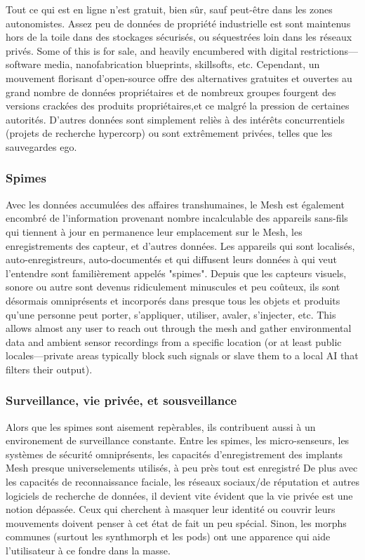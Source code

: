 Tout ce qui est en ligne n'est gratuit, bien sûr, sauf peut-être dans les zones autonomistes. Assez peu de données de propriété industrielle est sont maintenus hors de la toile dans des stockages sécurisés, ou séquestrées loin dans les réseaux privés. Some of this is for sale, and heavily encumbered with digital restrictions—software media, nanofabrication blueprints, skillsofts, etc. Cependant, un mouvement florisant d'open-source offre des alternatives gratuites et ouvertes au grand nombre de données propriétaires et de nombreux groupes fourgent des versions crackées des produits propriétaires,et ce malgré la pression de certaines autorités. D'autres données sont simplement reliès à des intérêts concurrentiels (projets de recherche hypercorp) ou sont extrêmement privées, telles que les sauvegardes ego. 

\subsubsection{Spimes} 

Avec les données accumulées des affaires transhumaines, le Mesh est également encombré de l'information provenant nombre incalculable des appareils sans-fils qui tiennent à jour en permanence leur emplacement sur le Mesh, les enregistrements des capteur, et d'autres données. Les appareils qui sont localisés, auto-enregistreurs, auto-documentés et qui diffusent leurs données à qui veut l'entendre sont familièrement appelés "spimes". Depuis que les capteurs visuels, sonore ou autre sont devenus ridiculement minuscules et peu coûteux, ils sont désormais omniprésents et incorporés dans presque tous les objets et produits qu'une personne peut porter, s'appliquer, utiliser, avaler, s'injecter, etc. This allows almost any user to reach out through the mesh and gather environmental data and ambient sensor recordings from a specific location (or at least public locales—private areas typically block such signals or slave them to a local AI that filters their output). 

\subsubsection{Surveillance, vie privée, et sousveillance} 

Alors que les spimes sont aisement repèrables, ils contribuent aussi à un environement de surveillance constante. Entre les spimes, les micro-senseurs, les systèmes de sécurité omniprésents, les capacités d'enregistrement des implants Mesh presque universelements utilisés, à peu près tout est enregistré De plus avec les capacités de reconnaissance faciale, les réseaux sociaux/de réputation et autres logiciels de recherche de données, il devient vite évident que la vie privée est une notion dépassée. Ceux qui cherchent à masquer leur identité ou couvrir leurs mouvements doivent penser à cet état de fait un peu spécial. Sinon, les morphs communes (surtout les synthmorph et les pods) ont une apparence qui aide l'utilisateur à ce fondre dans la masse. 

